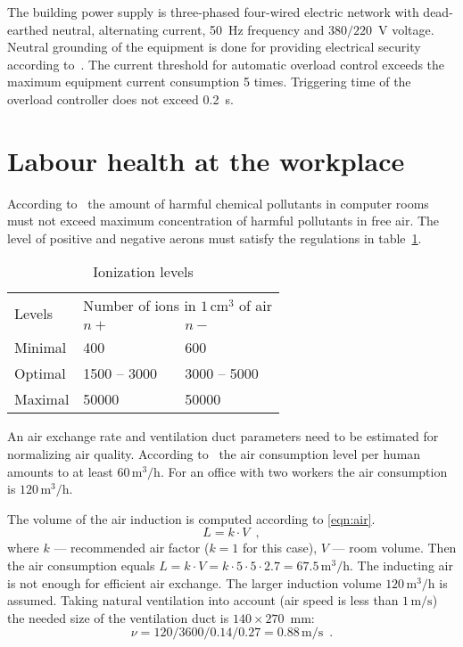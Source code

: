 The building power supply is three-phased four-wired electric network with
dead-earthed neutral, alternating current, 50~Hz frequency and $380/220$~V
voltage. Neutral grounding of the equipment is done for providing electrical
security according to~\cite{gost030}. The current threshold for automatic
overload control exceeds the maximum equipment current consumption 5 times.
Triggering time of the overload controller does not exceed 0.2~s.

\section{Labour health at the workplace}

According to~\cite{dsanpin} the amount of harmful chemical pollutants in
computer rooms must not exceed maximum concentration of harmful pollutants in
free air. The level of positive and negative aerons must satisfy the
regulations in table~\ref{tbl:aero-req}.

\begin{table}[htbp]
    \centering
    \caption{Ionization levels}
    \label{tbl:aero-req}
    \begin{tabular}{|l|l|l|}
        \hline
        \multirow{2}{*}{Levels} & \multicolumn{2}{l|}{Number of ions in $1 \, \text{cm}^3$ of air} \\ \cline{2-3}
        & $n+$ & $n-$ \\ \hline
        Minimal & 400 & 600 \\ \hline
        Optimal & 1500 -- 3000 & 3000 -- 5000 \\ \hline
        Maximal & 50000 & 50000 \\ \hline
    \end{tabular}
\end{table}

An air exchange rate and ventilation duct parameters need to be estimated for
normalizing air quality. According to~\cite{snip} the air consumption level per
human amounts to at least $60 \, \text{m}^3/\text{h}$. For an office with two
workers the air consumption is $120 \, \text{m}^3/\text{h}$.

The volume of the air induction is computed according to \eqref{eqn:air}.
\begin{equation}
    \label{eqn:air}
    L = k \cdot V \enspace, 
\end{equation}
where $k$ --- recommended air factor ($k=1$ for this case), $V$ --- room
volume. Then the air consumption equals
$L = k \cdot V = k \cdot 5 \cdot 5 \cdot 2.7 = 67.5 \, \text{m}^3/\text{h}$.
The inducting air is not enough for efficient air exchange. The larger
induction volume $120 \, \text{m}^3/\text{h}$ is assumed. Taking natural
ventilation into account (air speed is less than $1 \, \text{m/s}$) the needed
size of the ventilation duct is \mbox{$140 \times 270$~mm}:
\begin{equation}
    \nu = 120 / 3600 / 0.14 / 0.27 = 0.88 \, \text{m/s} \enspace.
\end{equation}


